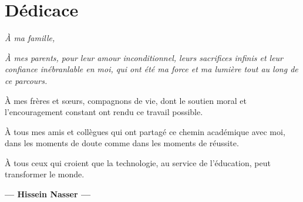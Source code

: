\chapter*{Dédicace}
\thispagestyle{empty}

\vspace*{3cm}

\begin{flushright}
\begin{minipage}{0.7\textwidth}
\begin{center}
{\Large\color{bleuprincipal}\textit{\og À ma famille, \fg{}}}

\vspace{1.5cm}

\normalsize\itshape
À mes parents, pour leur amour inconditionnel, leurs sacrifices
infinis et leur confiance inébranlable en moi, qui ont été
ma force et ma lumière tout au long de ce parcours.

\vspace{1cm}

À mes frères et sœurs, compagnons de vie, dont le soutien
moral et l'encouragement constant ont rendu ce travail possible.

\vspace{1cm}

À tous mes amis et collègues qui ont partagé ce chemin
académique avec moi, dans les moments de doute comme
dans les moments de réussite.

\vspace{1cm}

À tous ceux qui croient que la technologie, au service
de l'éducation, peut transformer le monde.

\vspace{2cm}

{\large\bfseries\color{bleuprincipal}--- Hissein Nasser ---}
\end{center}
\end{minipage}
\end{flushright}

\cleardoublepage
